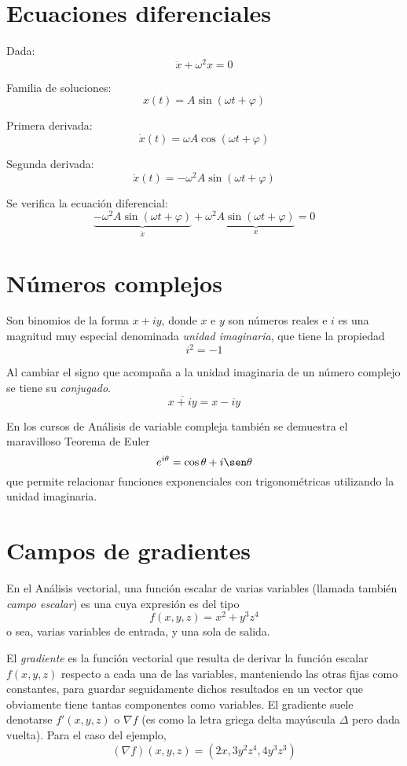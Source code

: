 \section{Ecuaciones diferenciales}

Dada:
\[ \ddot{x}+\omega^2 x=0 \]

Familia de soluciones:
\[ x(t) = A \sin{(\omega t + \varphi)} \]

Primera derivada:
\[ \dot{x}(t) = \omega A\cos{(\omega t + \varphi)} \]

Segunda derivada:
\[ \ddot{x}(t) = - \omega^2 A\sin{(\omega t + \varphi)} \]

Se verifica la ecuación diferencial:
\[ \underbrace{- \omega^2 A\sin{(\omega t + \varphi)}}_{\ddot{x}} + \omega^2 \underbrace{A \sin{(\omega t + \varphi)}}_{x} = 0 \]


\section{Números complejos}

Son binomios de la forma $x + iy$, donde $x$ e $y$ son números reales e $i$ es una magnitud muy especial denominada \emph{unidad imaginaria}, que tiene la propiedad
\[ i^2 = -1 \]

Al cambiar el signo que acompaña a la unidad imaginaria de un número complejo se tiene su \emph{conjugado}.
\[ \overline{x + iy} = x - iy \]

En los cursos de Análisis de variable compleja también se demuestra el maravilloso Teorema de Euler
\[ e^{i\theta} = \cos \theta + i \sen \theta \]
que permite relacionar funciones exponenciales con trigonométricas utilizando la unidad imaginaria.


\section{Campos de gradientes}

En el Análisis vectorial, una función escalar de varias variables (llamada también \emph{campo escalar}) es una cuya expresión es del tipo
\[ f(x, y, z) = x^2 + y^3 z^4 \]
o sea, varias variables de entrada, y una sola de salida.

El \emph{gradiente} es la función vectorial que resulta de derivar la función escalar $f(x, y, z)$ respecto a cada una de las variables, manteniendo las otras fijas como constantes, para guardar seguidamente dichos resultados en un vector que obviamente tiene tantas componentes como variables.
El gradiente suele denotarse $f'(x,y,z)$ o $\nabla f$ (es como la letra griega delta mayúscula $\Delta$ pero dada vuelta).
Para el caso del ejemplo,
\[ \left(\nabla f\right)\!(x, y, z) = \left( 2x, 3 y^2 z^4, 4 y^3 z^3 \right) \]

